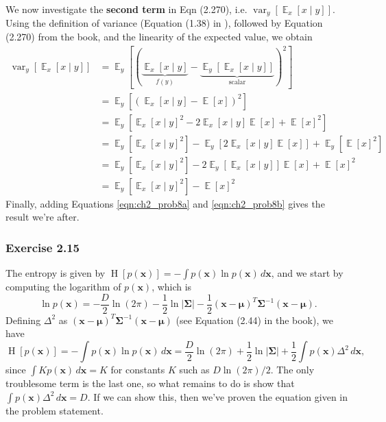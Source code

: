 \documentclass[12pt, a4paper]{article}
\newcommand{\vect}[1]{\bm{#1}}
\newcommand{\abs}[1]{\left\lvert#1\right\rvert}
\DeclareMathOperator{\E}{\mathbb{E}}
\DeclareMathOperator{\var}{\operatorname{var}}
\renewcommand{\H}{\operatorname{H}}
\begin{document}
We now investigate the \textbf{second term} in Eqn (2.270), i.e. 
$\var_y \left[ \E_x \left[ x \mid y \right] \right]$.
Using the definition of variance (Equation (1.38) in \cite{bishop_pattern_2011}), followed by Equation (2.270) from the book, and the linearity of the expected value, we obtain
\begin{align}
\nonumber \var_y \left[ \E_x \left[ x \mid y \right] \right]
&= \E_y \left[ 
\left( \underbrace{\E_x \left[ x \mid y \right]}_{f(y)} - 
\underbrace{\E_y \left[ \E_x \left[ x \mid y \right] \right]}_{\text{scalar}} 
\right)^2 \right]   \\
\nonumber &= \E_y \left[ 
\left( \E_x \left[ x \mid y \right] - 
\E[x]
\right)^2 \right] \tag{previous result} \\
\nonumber &= \E_y \left[ 
\E_x \left[ x \mid y \right]^2
-2 \E_x \left[ x \mid y \right] \E[x]
+\E[x]^2
\right] \tag{multiply} \\
\nonumber &= \E_y \left[ 
\E_x \left[ x \mid y \right]^2 \right]
-\E_y \left[ 2 \E_x \left[ x \mid y \right] \E[x] \right]
+\E_y \left[ \E[x]^2
\right] \tag{linearity} \\
 \nonumber &= \E_y \left[ 
\E_x \left[ x \mid y \right]^2 \right]
- 2 \E_y \left[ \E_x \left[ x \mid y \right] \right] \E[x] 
+ \E[x]^2
 \tag{constants}\\
\label{eqn:ch2_prob8b} &= \E_y \left[ 
 \E_x \left[ x \mid y \right]^2 \right]
 - \E[x]^2
\end{align}
Finally, adding Equations \eqref{eqn:ch2_prob8a} and \eqref{eqn:ch2_prob8b} gives the result we're after.


\subsubsection*{Exercise 2.15}
The entropy is given by $\H[p(\vect{x})] = - \int p(\vect{x}) \ln p(\vect{x}) \, d\vect{x}$, and we start by computing the logarithm of $p(\vect{x})$, which is
\begin{equation*}
	\ln p(\vect{x}) = -\frac{D}{2} \ln (2 \pi ) - \frac{1}{2} \ln \abs{\vect{\Sigma}} - \frac{1}{2} (\vect{x} - \vect{\mu})^T \vect{\Sigma}^{-1}(\vect{x} - \vect{\mu}).
\end{equation*}
Defining $\Delta^2$ as $(\vect{x} - \vect{\mu})^T \vect{\Sigma}^{-1}(\vect{x} - \vect{\mu})$ (see Equation (2.44) in the book), we have
\begin{equation*}
	\H[p(\vect{x})] = - \int p(\vect{x}) \ln p(\vect{x}) \, d\vect{x} = 
	\frac{D}{2} \ln (2 \pi ) + \frac{1}{2} \ln \abs{\vect{\Sigma}}
	+ \frac{1}{2}\int   p(\vect{x}) \Delta^2 \, d\vect{x},
\end{equation*}
since $\int K p(\vect{x}) \, d\vect{x} = K$ for constants $K$ such as $D \ln (2\pi) /2$.
The only troublesome term is the last one, so what remains to do is show that $\int p(\vect{x}) \Delta^2 \, d\vect{x} = D$.
If we can show this, then we've proven the equation given in the problem statement.
\end{document}
